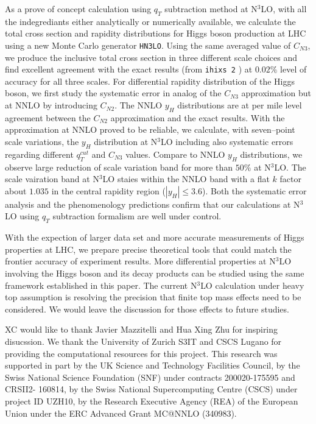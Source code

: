 \documentclass[12pt]{article}
\begin{document}
As a prove of concept calculation using $q_T$ subtraction method at N$^3$LO, with all the indegrediants either analytically or numerically available, we calculate the total cross section and rapidity distributions for Higgs boson production at LHC using a new Monte Carlo generator \texttt{HN3LO}. Using the same averaged value of $C_{N3}$, we produce the inclusive total cross section in three different scale choices and find excellent agreement with the exact results (from \texttt{ihixs 2} \cite{Dulat:2018rbf})  at $0.02\%$ level of accuracy for all three scales. For differential rapidity distribution of the Higgs boson, we first study the systematic error in analog of the $C_{N3}$ approximation but at NNLO by introducing $C_{N2}$. The NNLO $y_H$ distributions are at per mile level agreement between the $C_{N2}$ approximation and the exact results. With the approximation at NNLO proved to be reliable, we calculate, with seven--point scale variations, the $y_H$ distribution at N$^3$LO including also systematic errors regarding different $q_T^{cut}$ and $C_{N3}$ values. Compare to NNLO $y_H$ distributions, we observe large reduction of scale variation band for more than $50\%$ at N$^3$LO. The scale vairation band at N$^3$LO staies within the NNLO band with a flat $k$ factor about $1.035$ in the central rapidity region ($|y_H|\leq3.6$). Both the systematic error analysis and the phenomenology predictions confirm that our calculations at N$^3$LO using $q_T$ subtraction formalism are well under control.

With the expection of larger data set and more accurate measurements of Higgs properties at LHC, we prepare precise theoretical tools that could match the frontier accuracy of experiment results. More differential properties at N$^3$LO involving the Higgs boson and its decay products can be studied using the same framework established in this paper. The current N$^3$LO calculation under heavy top assumption is resolving the precision that finite top mass effects need to be considered. We would leave the discussion for those effects to future studies. 




XC would like to thank Javier Mazzitelli and Hua Xing Zhu for inspiring disucssion.
We thank the University of
Zurich S3IT and CSCS Lugano for providing the computational
resources for this project. This research was
supported in part by the UK Science and Technology Facilities
Council, by the Swiss National Science Foundation
(SNF) under contracts 200020-175595 and CRSII2-
160814, by the Swiss National Supercomputing Centre
(CSCS) under project ID UZH10, by the Research Executive
Agency (REA) of the European Union under
the ERC Advanced Grant MC@NNLO (340983).
\end{document}
